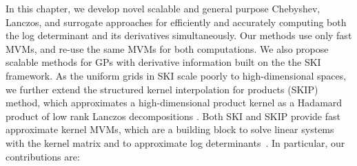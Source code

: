 In this chapter, we develop novel scalable and general purpose Chebyshev,
Lanczos, and surrogate approaches for efficiently and accurately computing both
the log determinant and its derivatives simultaneously. Our methods use only
fast MVMs, and re\hyp{}use the same MVMs for both computations. We also propose
scalable methods for GPs with derivative information built on the the SKI
framework. As the uniform grids in SKI scale poorly to high\hyp{}dimensional
spaces, we further extend the structured kernel interpolation for products 
(SKIP) method, which approximates a high\hyp{}dimensional product kernel as a
Hadamard product of low rank Lanczos decompositions \citep{gardner2018product}.
Both SKI and SKIP provide fast approximate kernel MVMs, which are a building
block to solve linear systems with the kernel matrix and to approximate log
determinants~\citep{dong2017scalable}. In particular, our contributions are:
